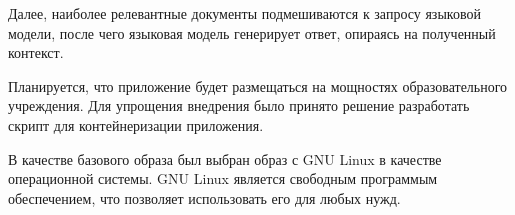 Далее, наиболее релевантные документы подмешиваются к запросу языковой модели,
после чего языковая модель генерирует ответ, опираясь на полученный контекст.

Планируется, что приложение будет размещаться на мощностях образовательного
учреждения. Для упрощения внедрения было принято решение разработать скрипт
для контейнеризации приложения.

В качестве базового образа был выбран образ с GNU Linux в качестве
операционной системы.
GNU Linux является свободным программым обеспечением, что позволяет
использовать его для любых нужд.


\showbib


